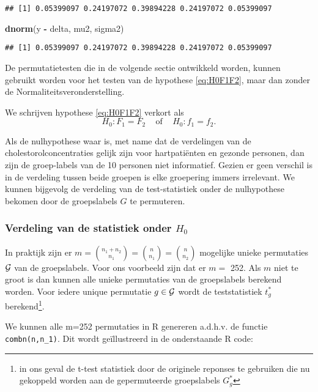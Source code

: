 \documentclass[12pt,dutch,coursenotes]{book}
\newenvironment{Shaded}{\begin{snugshade}}{\end{snugshade}}
\newcommand{\KeywordTok}[1]{\textcolor[rgb]{0.13,0.29,0.53}{\textbf{#1}}}
\newcommand{\StringTok}[1]{\textcolor[rgb]{0.31,0.60,0.02}{#1}}
\newcommand{\OperatorTok}[1]{\textcolor[rgb]{0.81,0.36,0.00}{\textbf{#1}}}
\newcommand{\NormalTok}[1]{#1}
\let\rmarkdownfootnote\footnote%
\def\footnote{\protect\rmarkdownfootnote}
\theoremstyle{definition}
\theoremstyle{definition}
\theoremstyle{definition}
\theoremstyle{remark}
\begin{document}
\begin{verbatim}
## [1] 0.05399097 0.24197072 0.39894228 0.24197072 0.05399097
\end{verbatim}

\begin{Shaded}
\begin{Highlighting}[]
\KeywordTok{dnorm}\NormalTok{(y }\OperatorTok{-}\StringTok{ }\NormalTok{delta, mu2, sigma2)}
\end{Highlighting}
\end{Shaded}

\begin{verbatim}
## [1] 0.05399097 0.24197072 0.39894228 0.24197072 0.05399097
\end{verbatim}

De permutatietesten die in de volgende sectie ontwikkeld worden, kunnen
gebruikt worden voor het testen van de hypothese \eqref{eq:H0F1F2}, maar
dan zonder de Normaliteitsveronderstelling.

We schrijven hypothese \eqref{eq:H0F1F2} verkort als \[
  H_0: F_1=F_2 \;\;\;\text{ of }\;\;\; H_0:f_1=f_2.
\]

Als de nulhypothese waar is, met name dat de verdelingen van de
cholestorolconcentraties gelijk zijn voor hartpatiënten en gezonde
personen, dan zijn de groep-labels van de 10 personen niet informatief.
Gezien er geen verschil is in de verdeling tussen beide groepen is elke
groepering immers irrelevant. We kunnen bijgevolg de verdeling van de
test-statistiek onder de nulhypothese bekomen door de groepslabels \(G\)
te permuteren.

\subsubsection{\texorpdfstring{Verdeling van de statistiek onder
\(H_0\)}{Verdeling van de statistiek onder H\_0}}\label{verdeling-van-de-statistiek-onder-h_0}

In praktijk zijn er
\(m=\binom{n_1+n_2}{n_1}=\binom{n}{n_1}=\binom{n}{n_2}\) mogelijke
unieke permutaties \(\cal{G}\) van de groepslabels. Voor ons voorbeeld
zijn dat er \(m=\) 252. Als \(m\) niet te groot is dan kunnen alle
unieke permutaties van de groepslabels berekend worden. Voor iedere
unique permutatie \(g \in \cal{G}\) wordt de teststatistiek \(t^*_g\)
berekend\footnote{in ons geval de t-test statistiek door de originele
  reponses te gebruiken die nu gekoppeld worden aan de gepermuteerde
  groepslabels \(G_g^*\)}.

We kunnen alle m=252 permutaties in R genereren a.d.h.v. de functie
\texttt{combn(n,n\_1)}. Dit wordt geïllustreerd in de onderstaande R
code:
\end{document}
